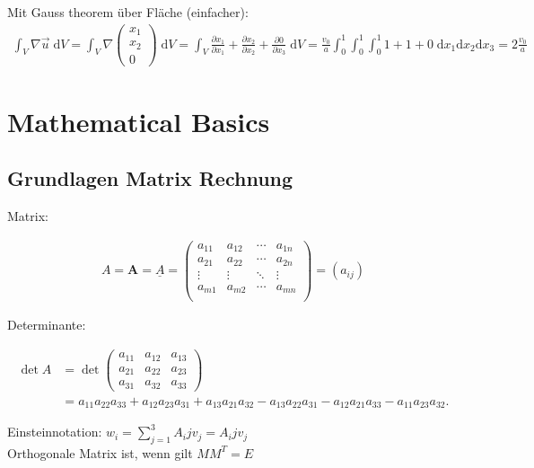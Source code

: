 \documentclass[a4paper, 10pt]{scrartcl}
\begin{document}
	Mit Gauss theorem über Fläche (einfacher):
	\begin{align}
		\int_V \nabla \vec u \; \mathrm dV = \int_V \nabla \begin{pmatrix}
			x_1\\ x_2\\ 0
		\end{pmatrix} \; \mathrm dV = \int_{V}
		\frac{\partial x_1}{\partial x_1} + \frac{\partial x_2}{\partial x_2} +
		\frac{\partial 0}{\partial x_3} \; \mathrm dV =
		\frac{v_0}{a}
		\int_{0}^{1}
		\int_{0}^{1}
		\int_{0}^{1} 1 + 1 + 0 \; \mathrm dx_1 \mathrm dx_2 \mathrm dx_3 = 2
		\frac{v_0}{a}
	\end{align}
	
	\section{Mathematical Basics}
	\subsection{Grundlagen Matrix Rechnung}
	
	Matrix:
	
	\begin{align}
		A=\mathbf{A}=\underline{A}=\begin{pmatrix} a_{11} & a_{12} & \cdots & a_{1n}\\
			a_{21} & a_{22} & \cdots & a_{2n}\\ \vdots & \vdots & \ddots & \vdots\\ a_{m1}
			& a_{m2} & \cdots & a_{mn}\\ \end{pmatrix} = (a_{ij})
	\end{align}
	
	Determinante:
	
	\begin{align} \det A &= \det \begin{pmatrix} a_{11} & a_{12} & a_{13} \\ a_{21}
			& a_{22} & a_{23} \\ a_{31} & a_{32} & a_{33} \end{pmatrix} \\ &= a_{11} a_{22}
		a_{33} +a_{12} a_{23} a_{31} + a_{13} a_{21} a_{32} - a_{13} a_{22} a_{31} -
		a_{12} a_{21} a_{33} - a_{11} a_{23} a_{32}. \end{align}
	
	
	Einsteinnotation: $w_i=\sum_{j=1}^{3}A_ijv_j=A_ijv_j$
	\\
	Orthogonale Matrix ist, wenn gilt $MM^T=E$
	\\
	
\end{document}

